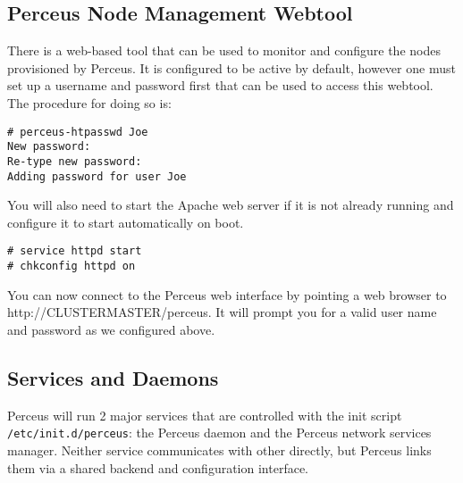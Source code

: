 \documentclass[10pt,letterpaper]{report}
\begin{document}
\subsection{Perceus Node Management Webtool}

There is a web-based tool that can be used to monitor and configure the nodes
provisioned by Perceus. It is configured to be active by default, however one
must set up a username and password first that can be used to access this
webtool. The procedure for doing so is:

\begin{verbatim}
# perceus-htpasswd Joe
New password:
Re-type new password:
Adding password for user Joe
\end{verbatim}

You will also need to start the Apache web server if it is not already
running and configure it to start automatically on boot.

\begin{verbatim}
# service httpd start
# chkconfig httpd on
\end{verbatim}

You can now connect to the Perceus web interface by pointing a web browser
to {\ttfamily http://CLUSTERMASTER/perceus}. It will prompt you for a valid
user name and password as we configured above.

\subsection{Services and Daemons}

Perceus will run 2 major services that are controlled with the init script
{\tt /etc/init.d/perceus}:  the Perceus daemon and the Perceus network
services manager. Neither service communicates with other directly, but
Perceus links them via a shared backend and configuration interface.
\end{document}
